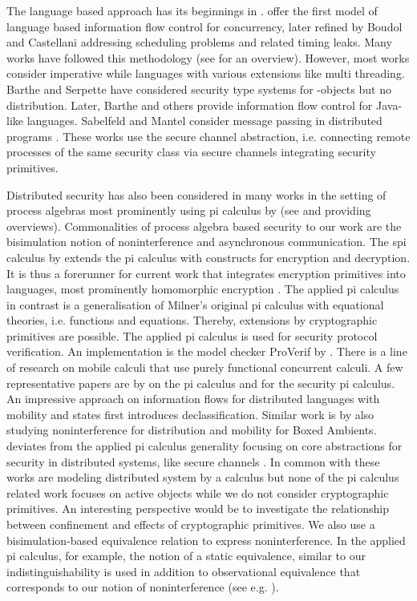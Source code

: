 \documentclass[10pt, conference, compsocconf]{IEEEtran}
\begin{document}
{The language based approach has its beginnings in \cite{vsi:96,vs:97}.
\cite{sv:98} offer the first model of language based 
information flow control  for concurrency, later refined by Boudol and Castellani
addressing scheduling problems and related timing leaks.
Many works have followed this methodology (see \cite{sm:03} for an overview).
However, most works consider imperative while languages with various extensions 
like multi threading. 
Barthe and Serpette  \cite{bs:00} have considered security type systems for -objects
but no distribution. Later, Barthe and others 
\cite{bpr:07,kam:08} provide information flow control for Java-like languages. 
Sabelfeld and Mantel consider message passing in distributed programs \cite{sm:02,ms:03}.
These works use the secure channel abstraction, i.e. connecting remote processes of
the same security class via secure channels integrating security primitives.

Distributed security has also been considered in many works in the setting of process algebras
most prominently using pi calculus by \cite{Mil:89}
(see \cite{fg:95} and \cite{rsglr:00} providing overviews). 
Commonalities of process algebra based security to our work are the bisimulation notion of 
noninterference and asynchronous communication. 
The spi calculus by \cite{ag:97} extends the pi calculus with constructs for encryption and
decryption. It is thus a forerunner for current work that integrates encryption primitives
into languages, most prominently homomorphic encryption \cite{fpr:11}.
The applied pi calculus \cite{af:01} in contrast is a generalisation of Milner's original
pi calculus with equational theories, i.e. functions and equations.
Thereby, extensions by cryptographic primitives are possible.
The applied pi calculus is used for security protocol verification. An 
implementation is the model checker ProVerif by \cite{cb:13}. 
There is a line of research on mobile calculi that use purely functional concurrent
calculi. A few representative papers are by \cite{hvy:00} on the pi calculus and
\cite{hr:02} for the security pi calculus. 
An impressive approach on information flows for distributed languages with mobility and states 
\cite{mc:11} first introduces declassification. Similar work is by \cite{bcc:01} also studying 
noninterference for distribution and mobility for Boxed Ambients.
\cite{bf:08} deviates from the applied pi calculus generality focusing on core abstractions
for security in distributed systems, like secure channels \cite{bf:10}.
In common with these works are modeling distributed system by a calculus but 
none of the pi calculus related work focuses on active objects while we do not
consider cryptographic primitives.
An interesting perspective would be to investigate the relationship between confinement
and effects of cryptographic primitives.
We also use a bisimulation-based equivalence relation to express noninterference.
In the applied pi calculus, for example, the notion of a static equivalence, similar
to our indistinguishability is used in addition to observational equivalence
that corresponds to our notion of noninterference (see e.g. \cite{dkr:10}). 

}
\end{document}
